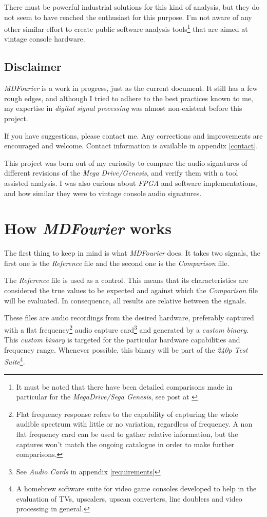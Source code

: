 \documentclass[10pt,a4paper]{report}
\begin{document}
There must be powerful industrial solutions for this kind of analysis, but they do not seem to have reached the enthusiast for this purpose. I'm not aware of any other similar effort to create public software analysis tools\footnote{It must be noted that there have been detailed comparisons made in particular for the \textit{MegaDrive/Sega Genesis}, see post at \cite{genesisaudio}} that are aimed at vintage console hardware. 

\newpage
\section{Disclaimer}

\textit{MDFourier} is a work in progress, just as the current document. It still has a few rough edges, and although I tried to adhere to the best practices known to me, my expertise in \textit{digital signal processing} was almost non-existent before this project. 

If you have suggestions, please contact me. Any corrections and improvements are encouraged and welcome. Contact information is available in appendix \ref{contact}.

This project was born out of my curiosity to compare the audio signatures of different revisions of the  \textit{Mega Drive/Genesis}, and verify them with a tool assisted analysis. I was also curious about \textit{FPGA} and software implementations, and how similar they were to vintage console audio signatures.

\chapter{How \textit{MDFourier} works}
\label{howitworks}

The first thing to keep in mind is what \textit{MDFourier} does. It takes two signals, the first one is the \textit{Reference} file and the second one is the \textit{Comparison} file.

The \textit{Reference} file is used as a control. This means that its characteristics are considered the true values to be expected and against which the \textit{Comparison} file will be evaluated. In consequence, all results are relative between the signals.

These files are audio recordings from the desired hardware, preferably captured with a flat frequency\footnote{Flat frequency response refers to the capability of capturing the whole audible spectrum with little or no variation, regardless of frequency. A non flat frequency card can be used to gather relative information, but the captures won't match the ongoing catalogue in order to make further comparisons.} audio capture card\footnote{See \textit{Audio Cards} in appendix \ref{requirements}} and generated by a \textit{custom binary}. This \textit{custom binary} is targeted for the particular hardware capabilities and frequency range. Whenever possible, this binary will be part of the \textit{240p Test Suite}\footnote{A homebrew software suite for video game consoles developed to help in the evaluation of TVs, upscalers, upscan converters, line doublers and video processing in general.\cite{240pSuite}}. 
\end{document}

